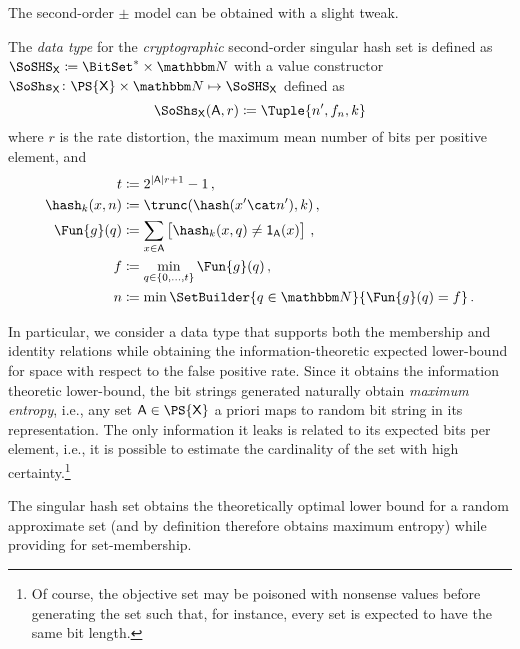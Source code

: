 \documentclass[ ../main.tex]{subfiles}
\begin{document}
The second-order $\pm$ model can be obtained with a slight tweak.

\begin{definition}
	\label{alg:makesecondorder}
	The \emph{data type} for the \emph{cryptographic} second-order singular hash set is defined as $\SoSHS_{\Set{X}} \coloneqq \BitSet^* \times \NatSet$ with a value constructor $\SoShs_{\Set{X}} \colon \PS{\Set{X}} \times \NatSet \mapsto \SoSHS_{\Set{X}}$ defined as
	\begin{equation}
	\SoShs_{\Set{X}}(\Set{A},r) \coloneqq \Tuple{n',f_n,k}
	\end{equation}
	where $r$ is the rate distortion, the maximum mean number of bits per positive element, and
	\begin{equation}
	\begin{split}
	t			& \coloneqq 2^{\Card{\Set{A}} r+1}-1\,,\\
	\hash_k(x,n)& \coloneqq \trunc(\hash(x' \cat n'),k)\,,\\	
	\Fun{g}(q) 	& \coloneqq \sum_{{x \in \Set{A}}}\left[\hash_k(x,q) \neq \SetIndicator{\Set{A}}(x)\right]\,,\\
	f 			& \coloneqq \min_{q \in \{0,\ldots,t\}} \Fun{g}(q)\,,\\
	n			& \coloneqq \min \SetBuilder{q \in \NatSet}{\Fun{g}(q) = f}\,.\\	
	\end{split}
	\end{equation}
\end{definition}





In particular, we consider a data type that supports both the membership and identity relations while obtaining the information-theoretic expected lower-bound for space with respect to the false positive rate.
Since it obtains the information theoretic lower-bound, the bit strings generated naturally obtain \emph{maximum entropy}, i.e., any set $\Set{A} \in \PS{\Set{X}}$ a priori maps to random bit string in its representation.
The only information it leaks is related to its expected bits per element, i.e., it is possible to estimate the cardinality of the set with high certainty.\footnote{Of course, the objective set may be poisoned with nonsense values before generating the set such that, for instance, every set is expected to have the same bit length.}


The singular hash set obtains the theoretically optimal lower bound for a random approximate set (and by definition therefore obtains maximum entropy) while providing for set-membership.
\end{document}
